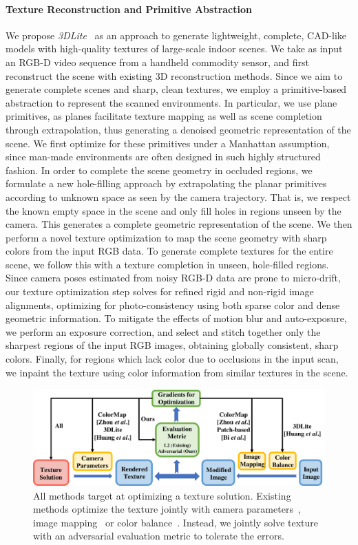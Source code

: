 \paragraph*{Texture Reconstruction and Primitive Abstraction}
We propose \emph{3DLite}~\cite{huang20173dlite} as an approach to generate lightweight, complete, CAD-like models with high-quality textures of large-scale indoor scenes.
We take as input an RGB-D video sequence from a handheld commodity sensor, and first reconstruct the scene with existing 3D reconstruction methods.
Since we aim to generate complete scenes and sharp, clean textures, we employ a primitive-based abstraction to represent the scanned environments.
In particular, we use plane primitives, as planes facilitate texture mapping as well as scene completion through extrapolation, thus generating a denoised geometric representation of the scene.
We first optimize for these primitives under a Manhattan assumption, since man-made environments are often designed in such highly structured fashion.
In order to complete the scene geometry in occluded regions, we formulate a new hole-filling approach by extrapolating the planar primitives according to unknown space as seen by the camera trajectory.
That is, we respect the known empty space in the scene and only fill holes in regions unseen by the camera.
This generates a complete geometric representation of the scene.
We then perform a novel texture optimization to map the scene geometry with sharp colors from the input RGB data.
To generate complete textures for the entire scene, we follow this with a texture completion in unseen, hole-filled regions.
Since camera poses estimated from noisy RGB-D data are prone to micro-drift, our texture optimization step solves for refined rigid and non-rigid image alignments, optimizing for photo-consistency using both sparse color and dense geometric information.
To mitigate the effects of motion blur and auto-exposure, we perform an exposure correction, and select and stitch together only the sharpest regions of the input RGB images, obtaining globally consistent, sharp colors.
Finally, for regions which lack color due to occlusions in the input scan, we inpaint the texture using color information from similar textures in the scene.

\begin{figure}
    \centering
	\includegraphics[width=\linewidth]{texturegen/figures/concept.pdf}
	\caption{All methods target at optimizing a texture solution. Existing methods optimize the texture jointly with camera parameters~\cite{zhou2014color,huang20173dlite}, image mapping~\cite{zhou2014color,bi2017patch} or color balance~\cite{huang20173dlite}. Instead, we jointly solve texture with an adversarial evaluation metric to tolerate the errors.}
	\label{fig:toptim-concept}
\end{figure}

